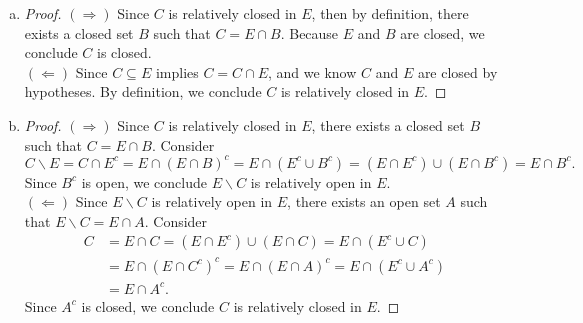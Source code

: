 \begin{Exercise}
\begin{enumerate}[a)]
\item
\begin{proof}
$(\Longrightarrow)$
Since $C$ is relatively closed in $E$, then by definition, there exists a closed set $B$ such that $C=E\cap B$. Because $E$ and $B$ are closed, we conclude $C$ is closed.\\

$(\Longleftarrow)$
Since $C\subseteq E$ implies $C=C\cap E$, and we know $C$ and $E$ are closed by hypotheses. By definition, we conclude $C$ is relatively closed in $E$.
\end{proof}

\item
\begin{proof}
$(\Longrightarrow)$
Since $C$ is relatively closed in $E$, there exists a closed set $B$ such that $C=E\cap B$. Consider
$$
C\backslash E 
= C\cap E^c 
= E\cap \left(E\cap B \right)^c 
= E\cap \left( E^c\cup B^c \right) 
= \left( E\cap E^c\right) \cup \left( E \cap B^c\right)
= E\cap B^c.
$$
Since $B^c$ is open, we conclude $E\backslash C$ is relatively open in $E$.\\

$(\Longleftarrow)$
Since $E\backslash C$ is relatively open in $E$, there exists an open set $A$ such that $E\backslash C = E\cap A$. Consider
\begin{align*}
C
&= E\cap C
= \left( E\cap E^c \right) \cup \left(E \cap C\right)
= E\cap \left( E^c \cup C \right) \\
&= E\cap \left( E\cap C^c \right)^c
= E\cap \left( E\cap A \right)^c
= E\cap \left( E^c \cup A^c \right) \\
&= E \cap A^c.
\end{align*}
Since $A^c$ is closed, we conclude $C$ is relatively closed in $E$.
\end{proof}

\end{enumerate}
\end{Exercise}